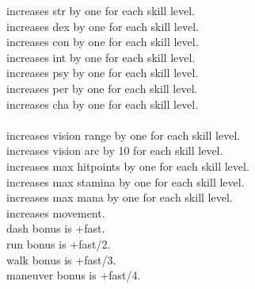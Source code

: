  increases str by one for each skill level. \\
 increases dex by one for each skill level. \\
 increases con by one for each skill level. \\
 increases int by one for each skill level. \\
 increases psy by one for each skill level. \\
 increases per by one for each skill level. \\
 increases cha by one for each skill level. \\
 \\
 increases vision range by one for each skill level. \\
 increases vision arc by 10 for each skill level. \\
 increases max hitpoints by one for each skill level. \\
 increases max stamina by one for each skill level. \\
 increases max mana by one for each skill level. \\
 increases movement. \\
dash bonus is +fast. \\
run bonus is +fast/2. \\
walk bonus is +fast/3. \\
maneuver bonus is +fast/4.

\closeskillslist


